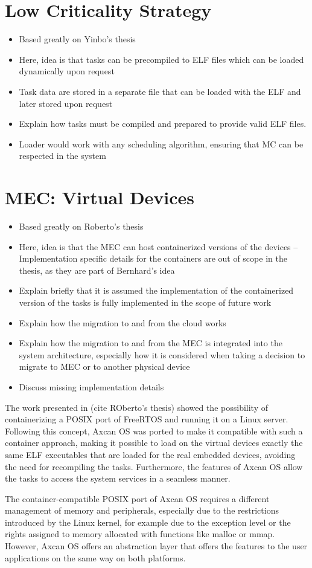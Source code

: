 \section{Low Criticality Strategy}
\begin{itemize}
	\item Based greatly on Yinbo's thesis
	\item Here, idea is that tasks can be precompiled to ELF files which can be loaded dynamically upon request
	\item Task data are stored in a separate file that can be loaded with the ELF and later stored upon request
	\item Explain how tasks must be compiled and prepared to provide valid ELF files.
	\item Loader would work with any scheduling algorithm, ensuring that MC can be respected in the system
\end{itemize}






\section{MEC: Virtual Devices}
\begin{itemize}
	\item Based greatly on Roberto's thesis
	\item Here, idea is that the MEC can host containerized versions of the devices -- Implementation specific details for the containers are out of scope in the thesis, as they are part of Bernhard's idea
	\item Explain briefly that it is assumed the implementation of the containerized version of the tasks is fully implemented in the scope of future work
	\item Explain how the migration to and from the cloud works
	\item Explain how the migration to and from the MEC is integrated into the system architecture, especially how it is considered when taking a decision to migrate to MEC or to another physical device
	\item Discuss missing implementation details
\end{itemize}

The work presented in (cite ROberto's thesis) showed the possibility of containerizing a POSIX port of FreeRTOS and running it on a Linux server. Following this concept, Axcan OS was ported to make it compatible with such a container approach, making it possible to load on the virtual devices exactly the same ELF executables that are loaded for the real embedded devices, avoiding the need for recompiling the tasks. Furthermore, the features of Axcan OS allow the tasks to access the system services in a seamless manner.

The container-compatible POSIX port of Axcan OS requires a different management of memory and peripherals, especially due to the restrictions introduced by the Linux kernel, for example due to the exception level or the rights assigned to memory allocated with functions like malloc or mmap. However, Axcan OS offers an abstraction layer that offers the features to the user applications on the same way on both platforms.
	

